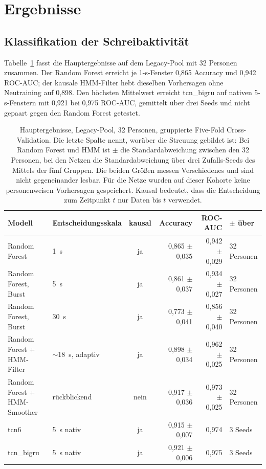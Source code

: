 \section{Ergebnisse}
\label{sec:results}

\subsection{Klassifikation der Schreibaktivität}
\label{sec:main-results}

Tabelle~\ref{tab:main} fasst die Hauptergebnisse auf dem Legacy-Pool mit 32
Personen zusammen. Der Random Forest erreicht je 1-s-Fenster 0,865 Accuracy
und 0,942 ROC-AUC; der kausale HMM-Filter hebt dieselben Vorhersagen ohne
Neutraining auf 0,898. Den höchsten Mittelwert erreicht tcn\_bigru auf
nativen 5-s-Fenstern mit 0,921 bei 0,975 ROC-AUC, gemittelt über drei
Seeds und nicht gepaart gegen den Random Forest getestet.

\begin{table}[H]
  \centering
  \caption{Hauptergebnisse, Legacy-Pool, 32 Personen, gruppierte
  Five-Fold Cross-Validation. Die letzte Spalte nennt, worüber die Streuung gebildet ist:
  Bei Random Forest und HMM ist $\pm$ die Standardabweichung zwischen den 32
  Personen, bei den Netzen die Standardabweichung über drei Zufalls-Seeds des
  Mittels der fünf Gruppen. Die beiden Größen messen Verschiedenes und sind
  nicht gegeneinander lesbar. Für die Netze wurden auf dieser Kohorte keine
  personenweisen Vorhersagen gespeichert. Kausal bedeutet, dass die
  Entscheidung zum Zeitpunkt $t$ nur Daten bis $t$ verwendet.}
  \label{tab:main}
  \footnotesize
  \setlength{\tabcolsep}{2.5pt}
  \begin{tabular}{llcrrl}
    \hline
    \textbf{Modell} & \textbf{Entscheidungsskala} & \textbf{kausal} & \textbf{Accuracy} & \textbf{ROC-AUC} & \textbf{$\pm$ über} \\ \hline \hline
    Random Forest & 1~s & ja & 0,865 $\pm$ 0,035 & 0,942 $\pm$ 0,029 & 32 Personen \\
    Random Forest, Burst & 5~s & ja & 0,861 $\pm$ 0,037 & 0,934 $\pm$ 0,027 & 32 Personen \\
    Random Forest, Burst & 30~s & ja & 0,773 $\pm$ 0,041 & 0,856 $\pm$ 0,040 & 32 Personen \\
    Random Forest + HMM-Filter & $\sim$18~s, adaptiv & ja & 0,898 $\pm$ 0,034 & 0,962 $\pm$ 0,025 & 32 Personen \\
    Random Forest + HMM-Smoother & rückblickend & nein & 0,917 $\pm$ 0,036 & 0,973 $\pm$ 0,025 & 32 Personen \\ \hline
    tcn6 & 5~s nativ & ja & 0,915 $\pm$ 0,007 & 0,974 & 3 Seeds \\
    tcn\_bigru & 5~s nativ & ja & 0,921 $\pm$ 0,006 & 0,975 & 3 Seeds \\ \hline
  \end{tabular}
\end{table}

